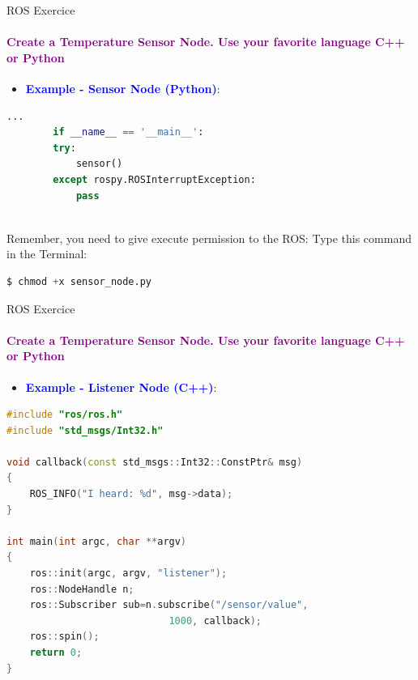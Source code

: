 \documentclass[aspectratio=169]{beamer}
\begin{document}
\begin{frame}[fragile]{ROS Exercice}
	\framesubtitle{\textcolor{purple}{Create a Temperature Sensor Node. Use your favorite language C++ or Python}}
	\begin{minipage}{0.6\textwidth}
	\begin{itemize}
		\item \textcolor{blue}{\textbf{Example - Sensor Node (Python)}}:
	\end{itemize}
	\begin{lstlisting}[language=Python]
		...
		if __name__ == '__main__':
		try:
			sensor()
		except rospy.ROSInterruptException:
			pass
	
    \end{lstlisting}
	\begin{block}{Remember, you need to give execute permission to the ROS:}
		Type this command in the Terminal:
		\begin{lstlisting}[language=Python]
		$ chmod +x sensor_node.py
		\end{lstlisting}
	\end{block}
\end{minipage}
\begin{minipage}{0.4\textwidth}
	
\end{minipage}
\end{frame}


\begin{frame}[fragile]{ROS Exercice}
	\framesubtitle{\textcolor{purple}{Create a Temperature Sensor Node. Use your favorite language C++ or Python}}
	\begin{minipage}{0.6\textwidth}
	\begin{itemize}
		\item \textcolor{blue}{\textbf{Example - Listener Node (C++)}}:
	\end{itemize}
	\begin{lstlisting}[language=C++]
#include "ros/ros.h"
#include "std_msgs/Int32.h"

void callback(const std_msgs::Int32::ConstPtr& msg)
{
	ROS_INFO("I heard: %d", msg->data);
}

int main(int argc, char **argv)
{
	ros::init(argc, argv, "listener");
	ros::NodeHandle n;
	ros::Subscriber sub=n.subscribe("/sensor/value", 
							1000, callback);
	ros::spin();
	return 0;
}
	
    \end{lstlisting}
\end{minipage}
\begin{minipage}{0.4\textwidth}
	
\end{minipage}
\end{frame}
\end{document}

